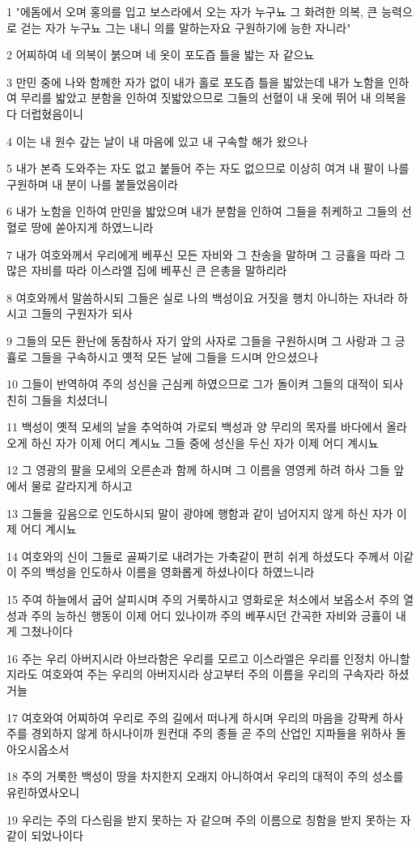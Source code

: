 \par 1 "에돔에서 오며 홍의를 입고 보스라에서 오는 자가 누구뇨 그 화려한 의복, 큰 능력으로 걷는 자가 누구뇨 그는 내니 의를 말하는자요 구원하기에 능한 자니라"
\par 2 어찌하여 네 의복이 붉으며 네 옷이 포도즙 틀을 밟는 자 같으뇨
\par 3 만민 중에 나와 함께한 자가 없이 내가 홀로 포도즙 틀을 밟았는데 내가 노함을 인하여 무리를 밟았고 분함을 인하여 짓밟았으므로 그들의 선혈이 내 옷에 뛰어 내 의복을 다 더럽혔음이니
\par 4 이는 내 원수 갚는 날이 내 마음에 있고 내 구속할 해가 왔으나
\par 5 내가 본즉 도와주는 자도 없고 붙들어 주는 자도 없으므로 이상히 여겨 내 팔이 나를 구원하며 내 분이 나를 붙들었음이라
\par 6 내가 노함을 인하여 만민을 밟았으며 내가 분함을 인하여 그들을 취케하고 그들의 선혈로 땅에 쏟아지게 하였느니라
\par 7 내가 여호와께서 우리에게 베푸신 모든 자비와 그 찬송을 말하며 그 긍휼을 따라 그 많은 자비를 따라 이스라엘 집에 베푸신 큰 은총을 말하리라
\par 8 여호와께서 말씀하시되 그들은 실로 나의 백성이요 거짓을 행치 아니하는 자녀라 하시고 그들의 구원자가 되사
\par 9 그들의 모든 환난에 동참하사 자기 앞의 사자로 그들을 구원하시며 그 사랑과 그 긍휼로 그들을 구속하시고 옛적 모든 날에 그들을 드시며 안으셨으나
\par 10 그들이 반역하여 주의 성신을 근심케 하였으므로 그가 돌이켜 그들의 대적이 되사 친히 그들을 치셨더니
\par 11 백성이 옛적 모세의 날을 추억하여 가로되 백성과 양 무리의 목자를 바다에서 올라오게 하신 자가 이제 어디 계시뇨 그들 중에 성신을 두신 자가 이제 어디 계시뇨
\par 12 그 영광의 팔을 모세의 오른손과 함께 하시며 그 이름을 영영케 하려 하사 그들 앞에서 물로 갈라지게 하시고
\par 13 그들을 깊음으로 인도하시되 말이 광야에 행함과 같이 넘어지지 않게 하신 자가 이제 어디 계시뇨
\par 14 여호와의 신이 그들로 골짜기로 내려가는 가축같이 편히 쉬게 하셨도다 주께서 이같이 주의 백성을 인도하사 이름을 영화롭게 하셨나이다 하였느니라
\par 15 주여 하늘에서 굽어 살피시며 주의 거룩하시고 영화로운 처소에서 보옵소서 주의 열성과 주의 능하신 행동이 이제 어디 있나이까 주의 베푸시던 간곡한 자비와 긍휼이 내게 그쳤나이다
\par 16 주는 우리 아버지시라 아브라함은 우리를 모르고 이스라엘은 우리를 인정치 아니할지라도 여호와여 주는 우리의 아버지시라 상고부터 주의 이름을 우리의 구속자라 하셨거늘
\par 17 여호와여 어찌하여 우리로 주의 길에서 떠나게 하시며 우리의 마음을 강퍅케 하사 주를 경외하지 않게 하시나이까 원컨대 주의 종들 곧 주의 산업인 지파들을 위하사 돌아오시옵소서
\par 18 주의 거룩한 백성이 땅을 차지한지 오래지 아니하여서 우리의 대적이 주의 성소를 유린하였사오니
\par 19 우리는 주의 다스림을 받지 못하는 자 같으며 주의 이름으로 칭함을 받지 못하는 자 같이 되었나이다

